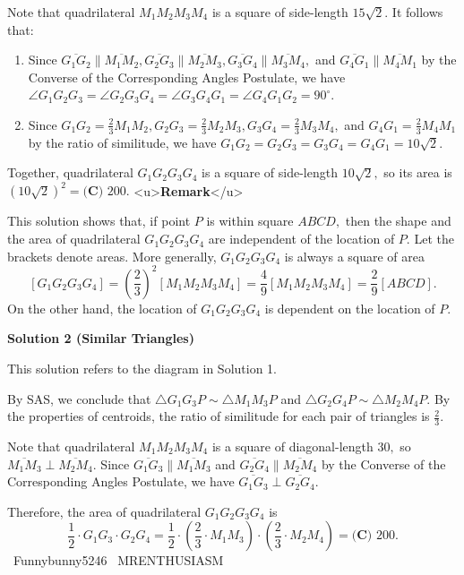 \begin{enumerate}
 Note that quadrilateral $M_1M_2M_3M_4$ is a square of side-length $15\sqrt2.$ It follows that:

 
            \begin{enumerate} 
        \item Since $\overline{G_1G_2}\parallel\overline{M_1M_2},\overline{G_2G_3}\parallel\overline{M_2M_3},\overline{G_3G_4}\parallel\overline{M_3M_4},$ and $\overline{G_4G_1}\parallel\overline{M_4M_1}$ by the Converse of the Corresponding Angles Postulate, we have $\angle G_1G_2G_3=\angle G_2G_3G_4=\angle G_3G_4G_1=\angle G_4G_1G_2=90^\circ.$

        \item Since $G_1G_2=\frac23M_1M_2, G_2G_3=\frac23M_2M_3, G_3G_4=\frac23M_3M_4,$ and $G_4G_1=\frac23M_4M_1$ by the ratio of similitude, we have $G_1G_2=G_2G_3=G_3G_4=G_4G_1=10\sqrt2.$

            \end{enumerate}
            Together, quadrilateral $G_1G_2G_3G_4$ is a square of side-length $10\sqrt2,$ so its area is $\left(10\sqrt2\right)^2=\boxed{\textbf{(C) }200}.$
<u>\textbf{Remark}</u>

 This solution shows that, if point $P$ is within square $ABCD,$ then the shape and the area of quadrilateral $G_1G_2G_3G_4$ are independent of the location of $P.$ Let the brackets denote areas. More generally, $G_1G_2G_3G_4$ is always a square of area 
 \[[G_1G_2G_3G_4]=\left(\frac23\right)^2[M_1M_2M_3M_4]=\frac49[M_1M_2M_3M_4]=\frac29[ABCD].\] On the other hand, the location of $G_1G_2G_3G_4$ is dependent on the location of $P.$




\textbf{Solution 2 (Similar Triangles)}

This solution refers to the diagram in Solution 1.

 By SAS, we conclude that $\triangle G_1G_3P\sim\triangle M_1M_3P$ and $\triangle G_2G_4P\sim\triangle M_2M_4P.$ By the properties of centroids, the ratio of similitude for each pair of triangles is $\frac23.$

 Note that quadrilateral $M_1M_2M_3M_4$ is a square of diagonal-length $30,$ so $\overline{M_1M_3}\perp\overline{M_2M_4}.$ Since $\overline{G_1G_3}\parallel\overline{M_1M_3}$ and $\overline{G_2G_4}\parallel\overline{M_2M_4}$ by the Converse of the Corresponding Angles Postulate, we have $\overline{G_1G_3}\perp\overline{G_2G_4}.$

 Therefore, the area of quadrilateral $G_1G_2G_3G_4$ is 
 \[\frac12\cdot G_1G_3\cdot G_2G_4 = \frac12\cdot\left(\frac23\cdot M_1M_3\right)\cdot\left(\frac23\cdot M_2M_4\right)=\boxed{\textbf{(C) }200}.\]~Funnybunny5246 ~MRENTHUSIASM


\end{enumerate}
